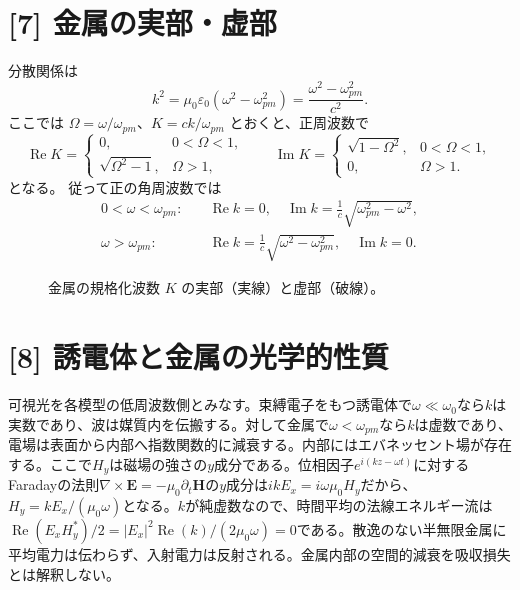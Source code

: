 \documentclass[11pt,a4paper]{article}
\begin{document}
\section*{[7] 金属の実部・虚部}
分散関係は
\begin{equation}
  k^2=\mu_0\varepsilon_0(\omega^2-\omega_{pm}^2)
  =\frac{\omega^2-\omega_{pm}^2}{c^2}.
\end{equation}
ここでは $\Omega=\omega/\omega_{pm}$、$K=ck/\omega_{pm}$ とおくと、正周波数で
\begin{equation}
 \operatorname{Re}K=\begin{cases}0,&0<\Omega<1,\\
 \sqrt{\Omega^2-1},&\Omega>1,\end{cases}\qquad
 \operatorname{Im}K=\begin{cases}\sqrt{1-\Omega^2},&0<\Omega<1,\\
 0,&\Omega>1.\end{cases}
\end{equation}
となる。
従って正の角周波数では
\begin{equation}
  \boxed{\begin{aligned}
    0<\omega<\omega_{pm}:&\quad \operatorname{Re}k=0,\quad
      \operatorname{Im}k=\frac1c\sqrt{\omega_{pm}^2-\omega^2},\\
    \omega>\omega_{pm}:&\quad \operatorname{Re}k=\frac1c\sqrt{\omega^2-\omega_{pm}^2},\quad
      \operatorname{Im}k=0.
  \end{aligned}}
\end{equation}
\begin{figure}[htbp]
\centering
{}
\caption{金属の規格化波数 $K$ の実部（実線）と虚部（破線）。}
\label{fig:metal-k}
\end{figure}

\section*{[8] 誘電体と金属の光学的性質}
可視光を各模型の低周波数側とみなす。束縛電子をもつ誘電体で$\omega\ll\omega_0$なら$k$は実数であり、波は媒質内を伝搬する。対して金属で$\omega<\omega_{pm}$なら$k$は虚数であり、電場は表面から内部へ指数関数的に減衰する。内部にはエバネッセント場が存在する。ここで$H_y$は磁場の強さの$y$成分である。位相因子$e^{i(kz-\omega t)}$に対するFaradayの法則$\nabla\times\boldsymbol E=-\mu_0\partial_t\boldsymbol H$の$y$成分は$ikE_x=i\omega\mu_0H_y$だから、$H_y=kE_x/(\mu_0\omega)$となる。$k$が純虚数なので、時間平均の法線エネルギー流は$\operatorname{Re}(E_xH_y^*)/2=|E_x|^2\operatorname{Re}(k)/(2\mu_0\omega)=0$である。散逸のない半無限金属に平均電力は伝わらず、入射電力は反射される。金属内部の空間的減衰を吸収損失とは解釈しない。
\end{document}
